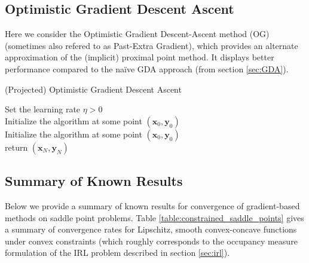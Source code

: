 \subsection{Optimistic Gradient Descent Ascent}

Here we consider the Optimistic Gradient Descent-Ascent method (OG) (sometimes also refered to as Past-Extra Gradient), which provides an alternate approximation of the (implicit) proximal point method. It displays better performance compared to the naïve GDA approach (from section \ref{sec:GDA}). 


\begin{algorithm}[H]
    \label{alg:projOG}
    \SetAlgoLined
    \caption{(Projected) Optimistic Gradient Descent Ascent}
    Set the learning rate $\eta >0$ \\
    Initialize the algorithm at some point $(\bm{x}_0,\bm{y}_0)$  \\
    Initialize the algorithm at some point $(\bm{x}_0,\bm{y}_0)$  \\
    return $(\bm{x}_N,\bm{y}_N)$
\end{algorithm}



\subsection{Summary of Known Results}

Below we provide a summary of known results for convergence of gradient-based methods on saddle point problems. Table \ref{table:constrained_saddle_points} gives a summary of convergence rates for Lipschitz, smooth convex-concave functions under convex constraints (which roughly corresponds to the occupancy measure formulation of the IRL problem described in section \ref{sec:irl}).


